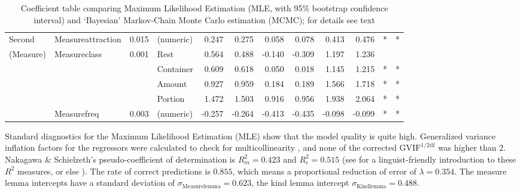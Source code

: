 \documentclass[USenglish]{article}
\begin{document}
\begin{table}
\begin{tabular}{llrlrrrrrrcc}
    Second    & Measureattraction & 0.015 & (numeric) &  0.247 &  0.275 &  0.058 &  0.078 &  0.413 &  0.476 &      * &      * \\
    (Measure) & Measureclass      & 0.001 & Rest      &  0.564 &  0.488 & -0.140 & -0.309 &  1.197 &  1.236 &        &        \\
              &                   &       & Container &  0.609 &  0.618 &  0.050 &  0.018 &  1.145 &  1.215 &      * &      * \\
              &                   &       & Amount    &  0.927 &  0.959 &  0.184 &  0.189 &  1.566 &  1.718 &      * &      * \\
              &                   &       & Portion   &  1.472 &  1.503 &  0.916 &  0.956 &  1.938 &  2.064 &      * &      * \\
              & Measurefreq       & 0.003 & (numeric) & -0.257 & -0.264 & -0.413 & -0.435 & -0.098 & -0.099 &      * &      * \\
  \end{tabular}
  \smallskip
  \caption{Coefficient table comparing Maximum Likelihood Estimation (MLE, with 95\% bootstrap confidence interval) and `Bayesian' Markov-Chain Monte Carlo estimation (MCMC); for details see text}
  \label{tab:bigtable}
\end{table}

Standard diagnostics for the Maximum Likelihood Estimation (MLE) show that the model quality is quite high.
Generalized variance inflation factors for the regressors were calculated to check for multicollinearity \citep{FoxMonette1992,ZuurEa2010}, and none of the corrected $\text{GVIF}^{1/2\text{df}}$ was higher than $2$.
Nakagawa \& Schielzeth's pseudo-coefficient of determination is $R_m^2=0.423$ and $R^2_c=0.515$ (see \citealp{Gries2015} for a linguist-friendly introduction to these $R^2$ measures, or else \citealp{NakagawaSchielzeth2013}).
The rate of correct predictions is $0.855$, which means a proportional reduction of error of $\lambda=0.354$.
The measure lemma intercepts have a standard deviation of $\sigma_{\text{Measurelemma}}=0.623$, the kind lemma intercept $\sigma_{\text{Kindlemma}}=0.488$.
\end{document}

